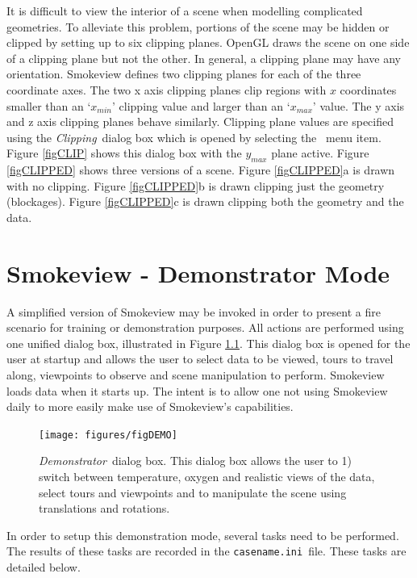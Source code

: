 \documentclass[11pt,twoside]{book}
\newcommand{\figoptions}{hbp}
\begin{document}
It is difficult to view the interior of a scene when modelling
complicated geometries.  To alleviate this problem, portions of
the scene may be hidden or clipped by setting up to six clipping
planes. OpenGL draws the scene on one side of a clipping plane but
not the other. In general, a clipping plane may have any
orientation. Smokeview defines two clipping planes for each of the
three coordinate axes.   The two x axis clipping planes clip
regions with $x$ coordinates smaller than an `$x_{min}$' clipping
value and larger than an `$x_{max}$' value. The y axis and z axis
clipping planes behave similarly.  Clipping plane values are
specified using the {\em Clipping}\ dialog box which is opened by
selecting the \ menu item. Figure
\ref{figCLIP} shows this dialog box with the $y_{max}$ plane active.
Figure \ref{figCLIPPED} shows three versions of a scene.
Figure \ref{figCLIPPED}a is drawn with no clipping.
Figure \ref{figCLIPPED}b is drawn clipping just the geometry (blockages).
Figure \ref{figCLIPPED}c is drawn clipping both the geometry and the data.

\chapter{Smokeview - Demonstrator Mode}
A simplified version of Smokeview may be invoked in order to present a fire scenario for training or demonstration
purposes.  All actions are performed using one unified dialog box, illustrated in Figure \ref{figDEMO}.  This dialog box is opened for the user at startup and allows the user to select data to be viewed, tours to travel along, viewpoints to observe and scene manipulation to perform.  Smokeview loads data when it starts up.
The intent is to allow one not using Smokeview daily to more easily make use of Smokeview's capabilities.


\begin{figure}[\figoptions]
\begin{center}
\texttt{[image: figures/figDEMO]}
\end{center}
\caption[{\em Demonstrator}\ dialog box.]{{\em Demonstrator}\ dialog box.
This dialog box allows the user to 1) switch between temperature, oxygen and realistic views of the data,
select tours and viewpoints
 and to manipulate the scene using translations and rotations.} \label{figDEMO}
\end{figure}

In order to setup this demonstration mode, several tasks need to be performed.  The results of these tasks are
recorded in the {\tt casename.ini}\ file.
These tasks are detailed below.
\end{document}
